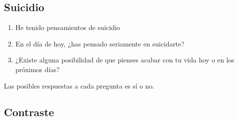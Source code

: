         \subsection{Suicidio}
            \begin{enumerate}
                \item He tenido pensamientos de suicidio
                \item En el día de hoy, ¿has pensado seriamente en suicidarte?
                \item ¿Existe alguna posibilidad de que pienses acabar con tu vida hoy o en los próximos días?
            \end{enumerate}
            Las posibles respuestas a cada pregunta es sí o no.

        \subsection{Contraste}
